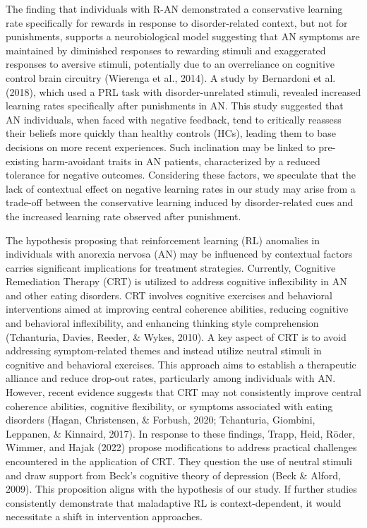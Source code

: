 \documentclass[
  man,floatsintext]{apa6}
\begin{document}
The finding that individuals with R-AN demonstrated a conservative learning rate specifically for rewards in response to disorder-related context, but not for punishments, supports a neurobiological model suggesting that AN symptoms are maintained by diminished responses to rewarding stimuli and exaggerated responses to aversive stimuli, potentially due to an overreliance on cognitive control brain circuitry (Wierenga et al., 2014). A study by Bernardoni et al. (2018), which used a PRL task with disorder-unrelated stimuli, revealed increased learning rates specifically after punishments in AN. This study suggested that AN individuals, when faced with negative feedback, tend to critically reassess their beliefs more quickly than healthy controls (HCs), leading them to base decisions on more recent experiences. Such inclination may be linked to pre-existing harm-avoidant traits in AN patients, characterized by a reduced tolerance for negative outcomes. Considering these factors, we speculate that the lack of contextual effect on negative learning rates in our study may arise from a trade-off between the conservative learning induced by disorder-related cues and the increased learning rate observed after punishment.

The hypothesis proposing that reinforcement learning (RL) anomalies in individuals with anorexia nervosa (AN) may be influenced by contextual factors carries significant implications for treatment strategies. Currently, Cognitive Remediation Therapy (CRT) is utilized to address cognitive inflexibility in AN and other eating disorders. CRT involves cognitive exercises and behavioral interventions aimed at improving central coherence abilities, reducing cognitive and behavioral inflexibility, and enhancing thinking style comprehension (Tchanturia, Davies, Reeder, \& Wykes, 2010). A key aspect of CRT is to avoid addressing symptom-related themes and instead utilize neutral stimuli in cognitive and behavioral exercises. This approach aims to establish a therapeutic alliance and reduce drop-out rates, particularly among individuals with AN. However, recent evidence suggests that CRT may not consistently improve central coherence abilities, cognitive flexibility, or symptoms associated with eating disorders (Hagan, Christensen, \& Forbush, 2020; Tchanturia, Giombini, Leppanen, \& Kinnaird, 2017). In response to these findings, Trapp, Heid, Röder, Wimmer, and Hajak (2022) propose modifications to address practical challenges encountered in the application of CRT. They question the use of neutral stimuli and draw support from Beck's cognitive theory of depression (Beck \& Alford, 2009). This proposition aligns with the hypothesis of our study. If further studies consistently demonstrate that maladaptive RL is context-dependent, it would necessitate a shift in intervention approaches.
\end{document}
